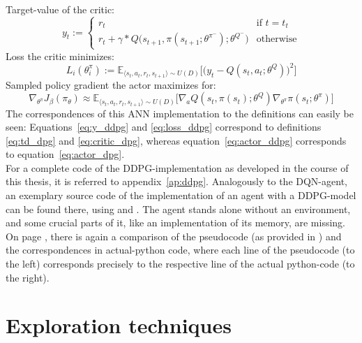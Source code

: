 \noindent Target-value of the critic:
\begin{equation} \label{eq:y_ddpg}
	y_t := \begin{cases} 
	r_t & \text{if } t = t_t\\
	r_t + \gamma * Q\big(s_{t+1}, \pi(s_{t+1};\theta^{\pi^-});\theta^{Q^-} \big)  & \text{otherwise} 
	\end{cases} %
\end{equation}
\noindent Loss the critic minimizes:
\begin{equation} \label{eq:loss_ddpg}
	L_i(\theta^\pi_i) := \mathds{E}_{\langle s_t,a_t,r_t,s_{t+1} \rangle \sim U(D)} \Big[\Big( y_t - Q(s_t,a_t;\theta^Q) \Big)^2\Big]
\end{equation}
\noindent Sampled policy gradient the actor maximizes for:
\begin{equation} \label{eq:actor_ddpg}
	\nabla_{\theta^\pi}J_\beta(\pi_\theta) \approx \mathds{E}_{\langle s_t,a_t,r_t,s_{t+1} \rangle \sim U(D)} \Big[ \nabla_a Q(s_t,\pi(s_t);\theta^Q) \nabla_{\theta^\pi} \pi(s_t;\theta^\pi) \Big]
\end{equation}
The correspondences of this ANN implementation to the definitions can easily be seen: Equations~\ref{eq:y_ddpg} and \ref{eq:loss_ddpg} correspond to definitions \ref{eq:td_dpg} and \ref{eq:critic_dpg}, whereas equation~\ref{eq:actor_ddpg} corresponds to equation~\ref{eq:actor_dpg}.\\

For a complete code of the DDPG-implementation as developed in the course of this thesis, it is referred to appendix~\ref{ap:ddpg}. Analogously to the DQN-agent, an exemplary source code of the implementation of an agent with a DDPG-model can be found there, using  and . The agent stands alone without an environment, and some crucial parts of it, like an implementation of its memory, are missing. On page \pageref{ap:ddpg_comparison}, there is again a comparison of the pseudocode (as provided in \cite{lillicrap_continuous_2015}) and the correspondences in actual-python code, where each line of the pseudocode (to the left) corresponds precisely to the respective line of the actual python-code (to the right).



\section{Exploration techniques}

